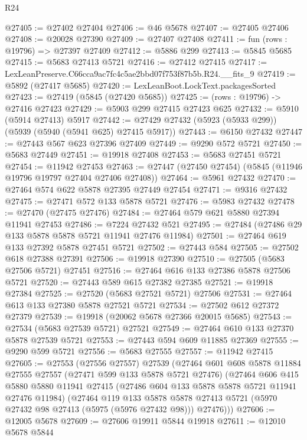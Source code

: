 \begin{lexlean}{R24}
\begin{coremodule}
@27405 := @27402 @27404
@27406 := @46 @5678
@27407 := @27405 @27406
@27408 := @20028 @27390
@27409 := @27407 @27408
@27411 := fun (rows : @19796) => @27397 @27409
@27412 := @5886 @299
@27413 := @5845 @5685
@27415 := @5683 @27413 @5721
@27416 := @27412 @27415
@27417 := LexLeanPreserve.C66cca9ac7fc4c5ae2bbd07f753f87b5b.R24.__fits_9
@27419 := @5892 (@27417 @5685)
@27420 := LexLeanBoot.LockText.packagesSorted
@27423 := @27419 (@5845 (@27420 @5685))
@27425 := (rows : @19796) -> @27416 @27423
@27429 := @5903 @299 @27415 @27423 @625
@27432 := @5910 (@5914 @27413) @5917
@27442 := @27429 @27432 (@5923 (@5933 @299)) (@5939 (@5940 (@5941 @625) @27415 @5917))
@27443 := @6150 @27432
@27447 := @27443 @567 @623 @27396 @27409
@27449 := @9290 @572 @5721
@27450 := @5683 @27449
@27451 := @19918 @27408
@27453 := @5683 @27451 @5721
@27454 := @11942 @27453
@27463 := @27447 (@27450 @27454) (@5845 (@11946 @19796 @19797 @27404 @27406 @27408))
@27464 := @5961 @27432
@27470 := @27464 @574 @622 @5878 @27395 @27449 @27454
@27471 := @9316 @27432
@27475 := @27471 @572 @133 @5878 @5721
@27476 := @5983 @27432
@27478 := @27470 (@27475 @27476)
@27484 := @27464 @579 @621 @5880 @27394 @11941 @27453
@27486 := @7224 @27432 @521
@27495 := @27484 (@27486 @29 @133 @5878 @5878 @5721 @11941 @27476 @11984)
@27501 := @27464 @619 @133 @27392 @5878 @27451 @5721
@27502 := @27443 @584
@27505 := @27502 @618 @27388 @27391
@27506 := @19918 @27390
@27510 := @27505 (@5683 @27506 @5721) @27451
@27516 := @27464 @616 @133 @27386 @5878 @27506 @5721
@27520 := @27443 @589 @615 @27382 @27385
@27521 := @19918 @27384
@27525 := @27520 (@5683 @27521 @5721) @27506
@27531 := @27464 @613 @133 @27380 @5878 @27521 @5721
@27534 := @27502 @612 @27372 @27379
@27539 := @19918 (@20062 @5678 @27366 @20015 @5685)
@27543 := @27534 (@5683 @27539 @5721) @27521
@27549 := @27464 @610 @133 @27370 @5878 @27539 @5721
@27553 := @27443 @594 @609 @11885 @27369
@27555 := @9290 @599 @5721
@27556 := @5683 @27555
@27557 := @11942 @27415
@27605 := @27553
    (@27556 @27557)
    @27539
    (@27464
      @601
      @608
      @5878
      @11884
      @27555
      @27557
      (@27471 @599 @133 @5878 @5721 @27476)
      (@27464
        @606
        @415
        @5880
        @5880
        @11941
        @27415
        (@27486 @604 @133 @5878 @5878 @5721 @11941 @27476 @11984)
        (@27464
          @119
          @133
          @5878
          @5878
          @27413
          @5721
          (@5970 @27432 @98 @27413 (@5975 (@5976 @27432 @98)))
          @27476)))
@27606 := @12005 @5678
@27609 := @27606 @19911 @5844 @19918
@27611 := @12010 @5678 @5844

\end{coremodule}
\end{lexlean}
